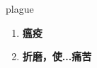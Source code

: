 
\begin{frame}
{\huge plague}
\begin{center}
\begin{enumerate}\Large
  \item \textbf{瘟疫}
  \item \textbf{折磨，使...痛苦}
\end{enumerate}
\end{center}
\end{frame}
